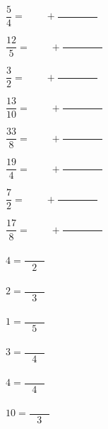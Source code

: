 
\begin{multicols}{2}
\begin{description}[itemsep=2em]
	\item $ \dfrac{5}{4} = \phantom{0000} + \dfrac{\phantom{00000000}}{} $
	\item $ \dfrac{12}{5} = \phantom{0000} + \dfrac{\phantom{00000000}}{} $
	\item $ \dfrac{3}{2} = \phantom{0000} + \dfrac{\phantom{00000000}}{} $
	\item $ \dfrac{13}{10} = \phantom{0000} + \dfrac{\phantom{00000000}}{} $
	\item $ \dfrac{33}{8} = \phantom{0000} + \dfrac{\phantom{00000000}}{} $
	\item $ \dfrac{19}{4} = \phantom{0000} + \dfrac{\phantom{00000000}}{} $
	\item $ \dfrac{7}{2} = \phantom{0000} + \dfrac{\phantom{00000000}}{} $
	\item $ \dfrac{17}{8} = \phantom{0000} + \dfrac{\phantom{00000000}}{} $
\end{description}
\end{multicols}



%


\begin{multicols}{3}
\begin{description}[itemsep=2em]
	\item $4= \dfrac{\phantom{0000}}{2}$
	\item $2= \dfrac{\phantom{0000}}{3}$
	\item $1= \dfrac{\phantom{0000}}{5}$
	\item $3= \dfrac{\phantom{0000}}{4}$
	\item $4= \dfrac{\phantom{0000}}{4}$
	\item $10= \dfrac{\phantom{0000}}{3}$
\end{description}
\end{multicols}

